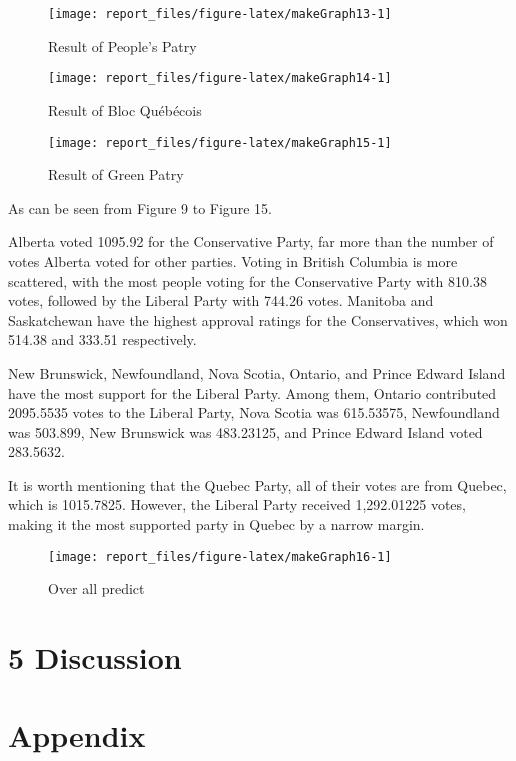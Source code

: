 \documentclass[
  12pt,
]{article}
\begin{document}
\begin{figure}
\texttt{[image: report\_files/figure-latex/makeGraph13-1]} \caption{Result of People's Patry}\label{fig:makeGraph13}
\end{figure}

\begin{figure}
\texttt{[image: report\_files/figure-latex/makeGraph14-1]} \caption{Result of Bloc Québécois}\label{fig:makeGraph14}
\end{figure}

\begin{figure}
\texttt{[image: report\_files/figure-latex/makeGraph15-1]} \caption{Result of Green Patry}\label{fig:makeGraph15}
\end{figure}

As can be seen from Figure 9 to Figure 15.

Alberta voted 1095.92 for the Conservative Party, far more than the
number of votes Alberta voted for other parties. Voting in British
Columbia is more scattered, with the most people voting for the
Conservative Party with 810.38 votes, followed by the Liberal Party with
744.26 votes. Manitoba and Saskatchewan have the highest approval
ratings for the Conservatives, which won 514.38 and 333.51 respectively.

New Brunswick, Newfoundland, Nova Scotia, Ontario, and Prince Edward
Island have the most support for the Liberal Party. Among them, Ontario
contributed 2095.5535 votes to the Liberal Party, Nova Scotia was
615.53575, Newfoundland was 503.899, New Brunswick was 483.23125, and
Prince Edward Island voted 283.5632.

It is worth mentioning that the Quebec Party, all of their votes are
from Quebec, which is 1015.7825. However, the Liberal Party received
1,292.01225 votes, making it the most supported party in Quebec by a
narrow margin.

\begin{figure}
\texttt{[image: report\_files/figure-latex/makeGraph16-1]} \caption{Over all predict}\label{fig:makeGraph16}
\end{figure}

\hypertarget{discussion}{%
\section{5 Discussion}\label{discussion}}

\pagebreak

\hypertarget{appendix}{%
\section{Appendix}\label{appendix}}
\end{document}
